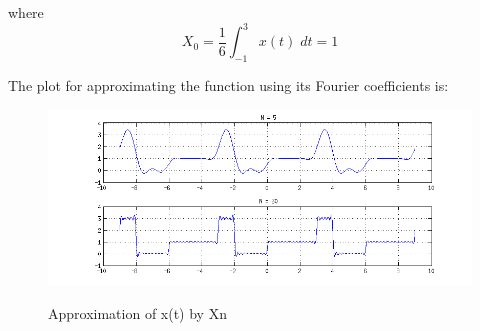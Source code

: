where 
\begin{equation*}
X_0 = \frac{1}{6} \int_{-1}^{3} x(t) \; dt = 1
\end{equation*} 

The plot for approximating the function using its Fourier coefficients is:


\begin{figure}[H]
\caption{Approximation of x(t) by Xn}
\centering
\includegraphics[width=1.0\textwidth]{figs/c1p5b.png}
\label{fig:c1p1c}
\end{figure} 
